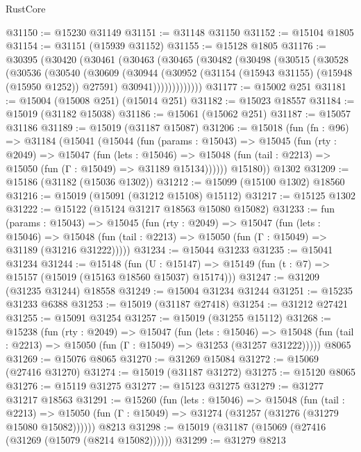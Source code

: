 \begin{lexlean}{RustCore}
\begin{coremodule}
@31150 := @15230 @31149
@31151 := @31148 @31150
@31152 := @15104 @1805
@31154 := @31151 (@15939 @31152)
@31155 := @15128 @1805
@31176 := @30395
    (@30420
      (@30461
        (@30463
          (@30465
            (@30482
              (@30498
                (@30515
                  (@30528
                    (@30536
                      (@30540
                        (@30609
                          (@30944
                            (@30952
                              (@31154 (@15943 @31155) (@15948 (@15950 @1252)) @27591)
                              @30941)))))))))))))
@31177 := @15002 @251
@31181 := @15004 (@15008 @251) (@15014 @251)
@31182 := @15023 @18557
@31184 := @15019 (@31182 @15038)
@31186 := @15061 (@15062 @251)
@31187 := @15057 @31186
@31189 := @15019 (@31187 @15087)
@31206 := @15018
    (fun (fn : @96) =>
    @31184
      (@15041
        (@15044
          (fun (params : @15043) =>
          @15045
            (fun (rty : @2049) =>
            @15047
              (fun (lets : @15046) =>
              @15048 (fun (tail : @2213) => @15050 (fun (Γ : @15049) => @31189 @15134))))))
        @15180))
    @1302
@31209 := @15186 (@31182 (@15036 @1302))
@31212 := @15099 (@15100 @1302) @18560
@31216 := @15019 (@15091 (@31212 @15108) @15112)
@31217 := @15125 @1302
@31222 := @15122 (@15124 @31217 @18563 @15080 @15082)
@31233 := fun (params : @15043) =>
  @15045
    (fun (rty : @2049) =>
    @15047
      (fun (lets : @15046) =>
      @15048 (fun (tail : @2213) => @15050 (fun (Γ : @15049) => @31189 (@31216 @31222)))))
@31234 := @15044 @31233
@31235 := @15041 @31234
@31244 := @15148
    (fun (U : @15147) => @15149 (fun (t : @7) => @15157 (@15019 (@15163 @18560 @15037) @15174)))
@31247 := @31209 (@31235 @31244) @18558
@31249 := @15004 @31234 @31244
@31251 := @15235 @31233 @6388
@31253 := @15019 (@31187 @27418)
@31254 := @31212 @27421
@31255 := @15091 @31254
@31257 := @15019 (@31255 @15112)
@31268 := @15238
    (fun (rty : @2049) =>
    @15047
      (fun (lets : @15046) =>
      @15048 (fun (tail : @2213) => @15050 (fun (Γ : @15049) => @31253 (@31257 @31222)))))
    @8065
@31269 := @15076 @8065
@31270 := @31269 @15084
@31272 := @15069 (@27416 @31270)
@31274 := @15019 (@31187 @31272)
@31275 := @15120 @8065
@31276 := @15119 @31275
@31277 := @15123 @31275
@31279 := @31277 @31217 @18563
@31291 := @15260
    (fun (lets : @15046) =>
    @15048
      (fun (tail : @2213) =>
      @15050 (fun (Γ : @15049) => @31274 (@31257 (@31276 (@31279 @15080 @15082))))))
    @8213
@31298 := @15019 (@31187 (@15069 (@27416 (@31269 (@15079 (@8214 @15082))))))
@31299 := @31279 @8213

\end{coremodule}
\end{lexlean}

